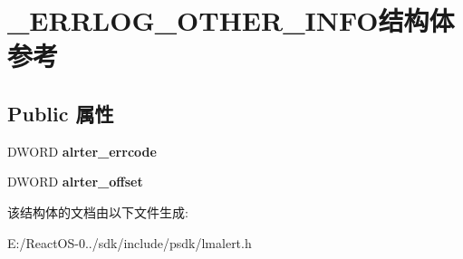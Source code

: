 \hypertarget{struct___e_r_r_l_o_g___o_t_h_e_r___i_n_f_o}{}\section{\+\_\+\+E\+R\+R\+L\+O\+G\+\_\+\+O\+T\+H\+E\+R\+\_\+\+I\+N\+F\+O结构体 参考}
\label{struct___e_r_r_l_o_g___o_t_h_e_r___i_n_f_o}
\subsection*{Public 属性}
\begin{DoxyCompactItemize}
\item 
\mbox{\label{struct___e_r_r_l_o_g___o_t_h_e_r___i_n_f_o_a7985013c2706b98a675f584ca9e69d0e}} 
D\+W\+O\+RD {\bfseries alrter\+\_\+errcode}
\item 
\mbox{\label{struct___e_r_r_l_o_g___o_t_h_e_r___i_n_f_o_a3daafcbfa049f9c631fbc48a7542cd2a}} 
D\+W\+O\+RD {\bfseries alrter\+\_\+offset}
\end{DoxyCompactItemize}


该结构体的文档由以下文件生成\+:\begin{DoxyCompactItemize}
\item 
E\+:/\+React\+O\+S-\/0../sdk/include/psdk/lmalert.\+h\end{DoxyCompactItemize}
